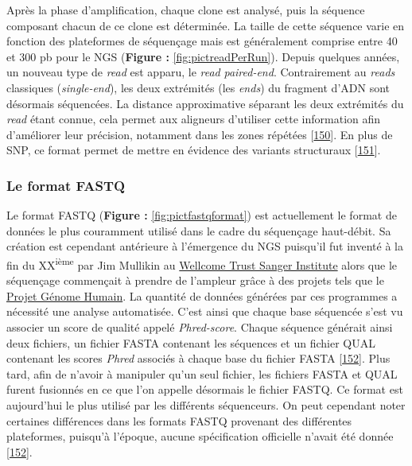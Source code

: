 \documentclass[12pt,a4paper,twoside]{ugathesis}
\theoremstyle{definition}
\theoremstyle{definition}
\theoremstyle{definition}
\theoremstyle{remark}
\begin{document}
Après la phase d'amplification, chaque clone est analysé, puis la
séquence composant chacun de ce clone est déterminée. La taille de cette
séquence varie en fonction des plateformes de séquençage mais est
généralement comprise entre 40 et 300 pb pour le NGS (\textbf{Figure :
}\ref{fig:pictreadPerRun}). Depuis quelques années, un nouveau type de
\emph{read} est apparu, le \emph{read} \emph{paired-end}. Contrairement
au \emph{reads} classiques (\emph{single-end}), les deux extrémités (les
\emph{ends}) du fragment d'ADN sont désormais séquencées. La distance
approximative séparant les deux extrémités du \emph{read} étant connue,
cela permet aux aligneurs d'utiliser cette information afin d'améliorer
leur précision, notamment dans les zones répétées
{[}\protect\hyperlink{ref-Li2008}{150}{]}. En plus de SNP, ce format
permet de mettre en évidence des variants structuraux
{[}\protect\hyperlink{ref-Korbel2009}{151}{]}.

\newpage

\subsubsection{Le format FASTQ}\label{fastq}

Le format FASTQ (\textbf{Figure : }\ref{fig:pictfastqformat}) est
actuellement le format de données le plus couramment utilisé dans le
cadre du séquençage haut-débit. Sa création est cependant antérieure à
l'émergence du NGS puisqu'il fut inventé à la fin du
XX\textsuperscript{ième} par Jim Mullikin au
\href{https://fr.wikipedia.org/wiki/Wellcome_Trust_Sanger_Institute}{Wellcome
Trust Sanger Institute} alors que le séquençage commençait à prendre de
l'ampleur grâce à des projets tels que le
\href{https://fr.wikipedia.org/wiki/Projet_G\%C3\%A9nome_Humain}{Projet
Génome Humain}. La quantité de données générées par ces programmes a
nécessité une analyse automatisée. C'est ainsi que chaque base séquencée
s'est vu associer un score de qualité appelé \emph{Phred-score}. Chaque
séquence générait ainsi deux fichiers, un fichier FASTA contenant les
séquences et un fichier QUAL contenant les scores \emph{Phred} associés
à chaque base du fichier FASTA
{[}\protect\hyperlink{ref-Cock2009}{152}{]}. Plus tard, afin de n'avoir
à manipuler qu'un seul fichier, les fichiers FASTA et QUAL furent
fusionnés en ce que l'on appelle désormais le fichier FASTQ. Ce format
est aujourd'hui le plus utilisé par les différents séquenceurs. On peut
cependant noter certaines différences dans les formats FASTQ provenant
des différentes plateformes, puisqu'à l'époque, aucune spécification
officielle n'avait été donnée
{[}\protect\hyperlink{ref-Cock2009}{152}{]}.
\end{document}
